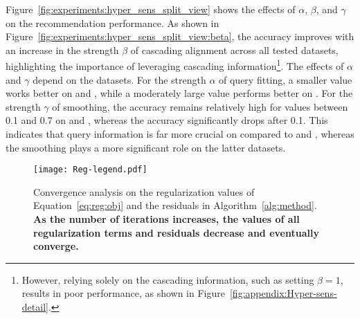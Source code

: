 Figure~\ref{fig:experiments:hyper_sens_split_view} shows the effects of $\alpha$, $\beta$, and $\gamma$ on the recommendation performance.
As shown in Figure~\ref{fig:experiments:hyper_sens_split_view:beta}, the accuracy improves with an increase in the strength $\beta$ of cascading alignment across all tested datasets, highlighting the importance of leveraging cascading information\footnote{However, relying solely on the cascading information, such as setting $\beta = 1$, results in poor performance, as shown in Figure~\ref{fig:appendix:Hyper-sens-detail}.}.
The effects of $\alpha$ and $\gamma$ depend on the datasets. 
For the strength $\alpha$ of query fitting, a smaller value works better on \taobao and \tenrec, while a moderately large value performs better on \tmall.
For the strength $\gamma$ of smoothing, the accuracy remains relatively high for values between 0.1 and 0.7 on \taobao and \tenrec, whereas the accuracy significantly drops after 0.1. 
This indicates that query information is far more crucial on \tmall compared to \taobao and \tenrec, whereas the smoothing plays a more significant role on the latter datasets.

\begin{figure}[t]
    \centering
    \texttt{[image: Reg-legend.pdf]}\\
    
    \caption{
        \label{fig:experiments:reg_convergence}
        Convergence analysis on the regularization values of Equation~\eqref{eq:reg:obj} and the residuals in Algorithm~\ref{alg:method}.
        \textbf{As the number of iterations increases, the values of all regularization terms and residuals decrease and eventually converge.}
    }
\end{figure}

